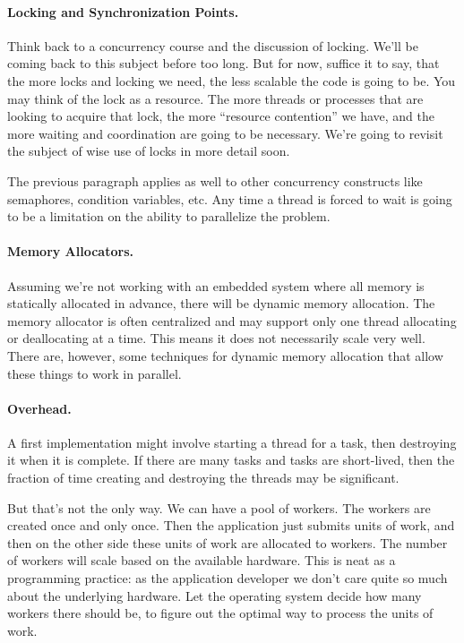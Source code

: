 \paragraph{Locking and Synchronization Points.}
Think back to a concurrency course and the discussion of locking. We'll be coming back to this subject before too long. But for now, suffice it to say, that the more locks and locking we need, the less scalable the code is going to be. You may think of the lock as a resource. The more threads or processes that are looking to acquire that lock, the more ``resource contention'' we have, and the more waiting and coordination are going to be necessary. We're going to revisit the subject of wise use of locks in more detail soon.

The previous paragraph applies as well to other concurrency constructs like semaphores, condition variables, etc. Any time a thread is forced to wait is going to be a limitation on the ability to parallelize the problem.

\paragraph{Memory Allocators.}
Assuming we're not working with an embedded system where all memory is statically allocated in advance, there will be dynamic memory allocation. The memory allocator is often centralized and may support only one thread allocating or deallocating at a time. This means it does not necessarily scale very well. There are, however, some techniques for dynamic memory allocation that allow these things to work in parallel.

\paragraph{Overhead.}
A first implementation might involve starting a thread for a task, then destroying it when it is complete. If there are many tasks and tasks are short-lived, then the fraction of time creating and destroying the threads may be significant.

 But that's not the only way. We can have a pool of workers. The workers are created once and only once. Then the application just submits units of work, and then on the other side these units of work are allocated to workers. The number of workers will scale based on the available hardware. This is neat as a programming practice: as the application developer we don't care quite so much about the underlying hardware. Let the operating system decide how many workers there should be, to figure out the optimal way to process the units of work.
 

